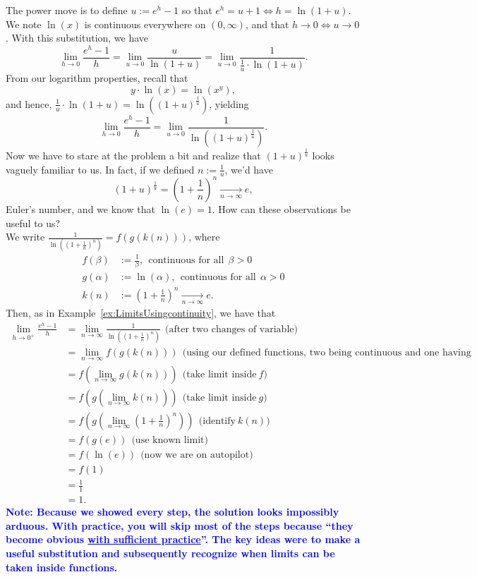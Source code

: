 The power move is to define $u:= e^h - 1$ so that $e^h = u + 1 \iff h = \ln(1 + u)$. We note $\ln(x)$ is continuous everywhere on $(0, \infty)$, and that $h \to 0 \iff u \to 0$. With this substitution, we have 
$$\displaystyle \lim_{h \to 0} \frac{e^h - 1}{h} = \lim_{u \to 0} \frac{u}{\ln(1+u)} = \lim_{u \to 0} \frac{1}{ \frac{1}{u} \cdot \ln(1+u)}. $$
From our logarithm properties, recall that
$$y \cdot \ln(x) = \ln(x^y),$$
and hence, $ \frac{1}{u} \cdot \ln(1+u)  = \ln\left((1+u)^{\frac{1}{u}} \right)$, yielding
$$\displaystyle \lim_{h \to 0} \frac{e^h - 1}{h} =  \lim_{u \to 0} \frac{1}{\ln\left((1+u)^{\frac{1}{u}} \right)}.$$
Now we have to stare at the problem a bit and realize that $(1+u)^{\frac{1}{u}}$ looks vaguely familiar to us. In fact, if we defined $n := \frac{1}{u}$, we'd have 
$$ (1+u)^{\frac{1}{u}} = \left( 1 + \frac{1}{n} \right)^n \underset{ n \to \infty}{\longrightarrow}  e,$$
Euler's number, and we know that $\ln(e) = 1$. How can these observations be useful to us?\\

We write $\frac{1}{\ln \left( \left( 1 + \frac{1}{n} \right)^n \right)} = f(g(k(n)))$, where
\begin{align*}
    f(\beta) &:= \frac{1}{\beta}, ~~\text{continuous for all}~~\beta > 0\\
    g(\alpha) & := \ln(\alpha), ~~\text{continuous for all}~~\alpha > 0\\
    k(n) &:=  \left( 1 + \frac{1}{n} \right)^n  \underset{ n \to \infty}{\longrightarrow}  e.
\end{align*}
Then, as in Example~\ref{ex:LimitsUsingcontinuity}, we have that
\begin{align*}
    \lim_{h \to 0^+} \frac{e^h - 1}{h}  &= \lim_{n \to \infty} \frac{1}{\ln\left(  \left( 1 + \frac{1}{n} \right)^n \right)}  ~~\text{(after two changes of variable)}\\
    &= \lim_{n \to \infty}  f(g(k(n))) ~~\text{(using our defined functions, two being continuous and one having a known limit)}\\
    & = f\left(  \lim_{n \to \infty}  g(k(n))\right) ~~\text{(take limit inside}~f)\\
    & = f\left(  g \left( \lim_{n \to \infty} k(n) \right) \right)  ~~\text{(take limit inside}~g)\\
    & = f\left(  g \left( \lim_{n \to \infty}  \left( 1 + \frac{1}{n} \right)^n \right) \right)  ~~\text{(identify}~k(n))\\
    & =  f\left(  g \left( e \right) \right)  ~~\text{(use known limit)}\\
    & =  f\left(  \ln \left( e \right) \right)  ~~\text{(now we are on autopilot)}\\
    & =  f\left(  1 \right)\\
    & = \frac{1}{1} \\
    & = 1.
\end{align*}
\textcolor{blue}{\bf Note: Because we showed every step, the solution looks impossibly arduous. With practice, you will skip most of the steps because ``they become obvious \underline{with sufficient practice}''. The key ideas were to make a useful substitution and subsequently recognize when limits can be taken inside functions.}
\Qed

